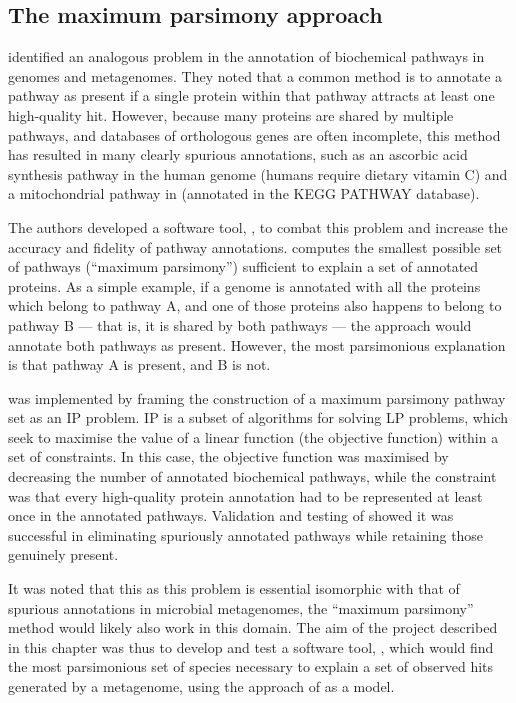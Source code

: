 \subsection{The maximum parsimony approach}

\citet{Ye:2009bl} identified an analogous problem in the annotation of biochemical pathways in genomes and metagenomes.
They noted that a common method is to annotate a pathway as present if a single protein within that pathway attracts at least one high-quality  hit.
However, because many proteins are shared by multiple pathways, and databases of orthologous genes are often incomplete, this method has resulted in many clearly spurious annotations, such as an ascorbic acid synthesis pathway in the human genome (humans require dietary vitamin C) and a mitochondrial pathway in  (annotated in the \ac{KEGG} PATHWAY database).

The authors developed a software tool, , to combat this problem and increase the accuracy and fidelity of pathway annotations.
 computes the smallest possible set of pathways (``maximum parsimony'') sufficient to explain a set of annotated proteins.
As a simple example, if a genome is annotated with all the proteins which belong to pathway A, and one of those proteins also happens to belong to pathway B --- that is, it is shared by both pathways --- the \naive{} approach would annotate both pathways as present.
However, the most parsimonious explanation is that pathway A is present, and B is not.

 was implemented by framing the construction of a maximum parsimony pathway set as an \ac{IP} problem.
\ac{IP} is a subset of algorithms for solving \ac{LP} problems, which seek to maximise the value of a linear function (the objective function) within a set of constraints.
In this case, the objective function was maximised by decreasing the number of annotated biochemical pathways, while the constraint was that every high-quality protein annotation had to be represented at least once in the annotated pathways.
Validation and testing of  showed it was successful in eliminating spuriously annotated pathways while retaining those genuinely present.

It was noted that this as this problem is essential isomorphic with that of spurious annotations in microbial metagenomes, the ``maximum parsimony'' method would likely also work in this domain.
The aim of the project described in this chapter was thus to develop and test a software tool, , which would find the most parsimonious set of species necessary to explain a set of observed  hits generated by a metagenome, using the approach of \cite{Ye:2009bl} as a model.

